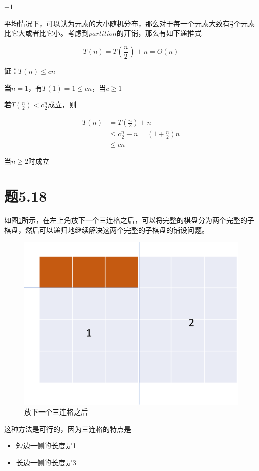\documentclass[a4paper,twoside]{article}
\begin{document}
\begin{spacing}{1.2}
\begin{algorithm}
\begin{algorithmic}[1]
	\State \Return $-1$
	\EndProcedure
\end{algorithmic}
\end{algorithm}

平均情况下，可以认为元素的大小随机分布，那么对于每一个元素大致有$\frac{n}{2}$个元素比它大或者比它小。考虑到$partition$的开销，那么有如下递推式

$$
T(n)=T(\frac{n}{2})+n=O(n)
$$

\textbf{证：}$T(n) \le cn$

\textbf{当}$n=1$，有$T(1)=1\le cn$，当$c\ge 1$

\textbf{若}$T(\frac{n}{2})<c\frac{n}{2}$成立，则

\begin{align*}
	T(n)&=T(\frac{n}{2})+n\\
	&\le c\frac{n}{2}+n =(1+\frac{n}{2})n \\
	&\le cn
\end{align*}

当$n\ge 2$时成立

\section{题5.18}


如图\ref{fig:chese}所示，在左上角放下一个三连格之后，可以将完整的棋盘分为两个完整的子棋盘，然后可以递归地继续解决这两个完整的子棋盘的铺设问题。

\begin{figure}[h]
	\centering
	\label{fig:chese}
	\includegraphics[width=0.5\linewidth]{cheseboard.png}
	\caption{放下一个三连格之后}
\end{figure}


这种方法是可行的，因为三连格的特点是

\begin{itemize}
	\item 短边一侧的长度是1
	\item 长边一侧的长度是3
\end{itemize}


\end{spacing}
\end{document}
